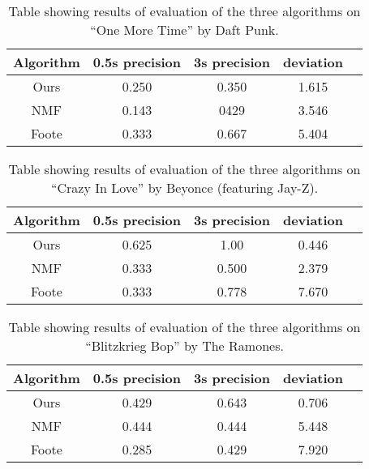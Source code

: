 \begin{table}
\begin{center}
\begin{tabular}{| c | c | c | c | c |} \hline 
Algorithm  &   0.5s precision   	&  3s precision 	&   deviation   	\\ \hline \hline
Ours			& 	0.250				&  0.350			& 	1.615		\\ \hline
NMF			&  0.143				&  0429				&	3.546		\\ \hline
Foote		&  0.333				&  0.667			& 	5.404		\\ \hline
\end{tabular}
\caption{Table showing results of evaluation of the three algorithms on ``One More Time'' by Daft Punk.}
\label{table:evalonemoretime}
\end{center}
\end{table}

\begin{table}
\begin{center}
\begin{tabular}{| c | c | c | c | c |} \hline 
Algorithm  &   0.5s precision   	&  3s precision 	&   deviation   	\\ \hline \hline
Ours			& 	0.625				&  1.00				& 	0.446		\\ \hline
NMF			&  0.333				&  0.500			&	2.379		\\ \hline
Foote		&  0.333				&  0.778			& 	7.670		\\ \hline
\end{tabular}
\caption{Table showing results of evaluation of the three algorithms on ``Crazy In Love'' by Beyonce (featuring Jay-Z).}
\label{table:evalcrazyinlove}
\end{center}
\end{table}


\begin{table}
\begin{center}
\begin{tabular}{| c | c | c | c | c |} \hline 
Algorithm  &   0.5s precision   	&  3s precision 	&   deviation   	\\ \hline \hline
Ours			& 	0.429				&  0.643				& 	0.706		\\ \hline
NMF			&  0.444				&  0.444				&	5.448		\\ \hline
Foote		&  0.285				&  0.429				& 	7.920		\\ \hline
\end{tabular}
\caption{Table showing results of evaluation of the three algorithms on ``Blitzkrieg Bop'' by The Ramones.}
\label{table:evalblitzkrieg}
\end{center}
\end{table}

